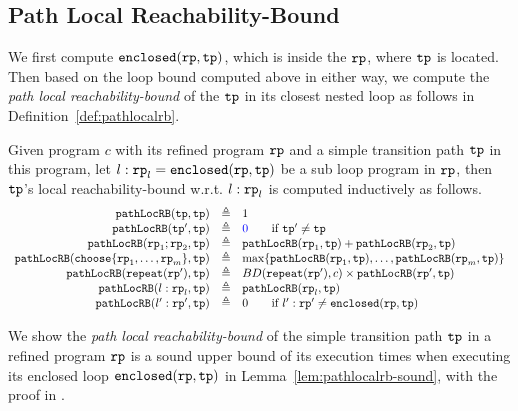 \subsection{Path Local Reachability-Bound}
We first compute $\mathtt{enclosed}(\mathtt{rp}, \mathtt{tp})$, which is  inside the $\mathtt{rp}$, where $\mathtt{tp}$ is located.
\\
Then based on the loop bound computed above in either way, we compute the \emph{path local reachability-bound} of
the $\mathtt{tp}$ in its closest nested loop as follows in Definition~\ref{def:pathlocalrb}.
\begin{defn}
    \label{def:pathlocalrb}
    Given program $c$ with its refined program $\mathtt{rp}$ and a simple transition path $\mathtt{tp}$ in this program, 
    let $l: \mathtt{rp}_l = \mathtt{enclosed}(\mathtt{rp}, \mathtt{tp})$ be a sub loop program in $\mathtt{rp}$,
    then $\mathtt{tp}$'s local reachability-bound w.r.t. $l: \mathtt{rp}_l$
    is computed inductively as follows. 
  \[
    \begin{array}{rcl}
      \outinB(\tpath, \tpath) & \triangleq & 1 \\
      \outinB(\tpath', \tpath) & \triangleq & \highlight{0} \qquad \text{if } \tpath' \neq \tpath\\
      \outinB(\rprog_1;\rprog_2, \tpath) & \triangleq & \outinB(\rprog_1, \tpath) + \outinB(\rprog_2, \tpath) \\
      \outinB(\rpchoose{\rprog_1, \ldots, \rprog_m }, \tpath) & \triangleq 
      & \max\left\{ \outinB(\rprog_1, \tpath), \ldots, \outinB(\rprog_m, \tpath) \right\} \\
      \outinB(\rprepeat(\rprog'), \tpath) & \triangleq 
      & BD(\rprepeat(\rprog'), c) \times \outinB(\rprog', \tpath)
       \\
       \outinB(l: \rprog_l, \tpath) & \triangleq & \outinB(\rprog_l, \tpath) \\
       \outinB(l': \rprog', \tpath) & \triangleq & 0  \qquad \text{if } l': \rprog' \neq \kw{enclosed}(\rprog, \tpath)
    \end{array}
    \]
\end{defn}
We show the \emph{path local reachability-bound} of the simple transition path $\mathtt{tp}$ in a refined program $\mathtt{rp}$ is a sound upper bound of its execution times when executing its enclosed loop $\mathtt{enclosed}(\mathtt{rp}, \mathtt{tp})$ in Lemma~\ref{lem:pathlocalrb-sound}, with the proof in .
